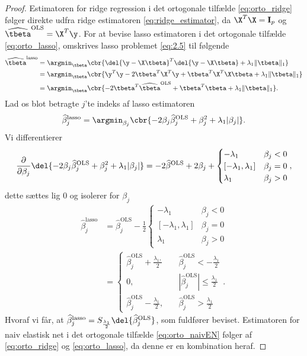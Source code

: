 \begin{proof}
Estimatoren for ridge regression i det ortogonale tilfælde \eqref{eq:orto_ridge} følger direkte udfra ridge estimatoren \eqref{eq:ridge_estimator}, da \(\X^T \X = \mathbf{I}_p\) og \(\widehat{\tbeta}^\text{OLS} = \X^T \y\).
For at bevise lasso estimatoren i det ortogonale tilfælde \eqref{eq:orto_lasso}, omskrives lasso problemet \eqref{eq:2.5} til følgende
\begin{align*}
\widehat{\tbeta}^\text{lasso} &= \argmin_{\tbeta} \cbr{\del{\y - \X \tbeta}^T \del{\y - \X \tbeta} + \lambda_1 \Vert \tbeta \Vert_1} \\
&= \argmin_{\tbeta} \cbr{ \y^T \y - 2 \tbeta^T \X^T \y + \tbeta^T \X^T \X \tbeta + \lambda_1 \Vert \tbeta \Vert_1} \\
&= \argmin_{\tbeta} \cbr{- 2 \tbeta^T \widehat{\tbeta}^\text{OLS} + \tbeta^T \tbeta + \lambda_1 \Vert \tbeta \Vert_1}.
\end{align*}
Lad os blot betragte \(j\)'te indeks af lasso estimatoren
\begin{align*}
\widehat{\beta}_j^\text{lasso} = \argmin_{\beta_j} \cbr{ - 2 \beta_j \widehat{\beta}_j^\text{OLS} + \beta_j^2 + \lambda_1 \vert \beta_j \vert}.
\end{align*}
Vi differentierer
\begin{align*}
\frac{\partial}{\partial \beta_j} \del{- 2 \beta_j \widehat{\beta}_j^\text{OLS} + \beta_j^2 + \lambda_1 \vert \beta_j \vert}
=-2\widehat{\beta}^\text{OLS} + 2\beta_j + \begin{cases}
-\lambda_1 \quad &\beta_j < 0 \\
[-\lambda_1, \lambda_1] & \beta_j = 0 \\
\lambda_1 & \beta_j >0 
\end{cases},
\end{align*}
dette sættes lig \(0\) og isolerer for \(\beta_j\)
\begin{align*}
\widehat{\beta}_j^\text{lasso} &= \widehat{\beta}_j^\text{OLS} - \frac{1}{2}\begin{cases}
-\lambda_1 \quad &\beta_j < 0 \\
[-\lambda_1, \lambda_1] & \beta_j = 0 \\
\lambda_1 & \beta_j >0 
\end{cases} \\
&= \begin{cases}
\widehat{\beta}_j^\text{OLS} + \frac{\lambda_1,}{2} \quad &\widehat{\beta}_j^\text{OLS} < - \frac{\lambda_1}{2} \\
0, &\left\vert\widehat{\beta}_j^\text{OLS} \right\vert \leq \frac{\lambda_1}{2} \\
\widehat{\beta}_j^\text{OLS} - \frac{\lambda_1}{2}, \quad &\widehat{\beta}_j^\text{OLS} > \frac{\lambda_1}{2}
\end{cases}. 
\end{align*}
Hvoraf vi får, at \(\widehat{\beta}_j^\text{lasso} = S_{\frac{\lambda_1}{2}} \del{ \widehat{\beta}_j^\text{OLS}} \), som fuldfører beviset.
Estimatoren for naiv elastisk net i det ortogonale tilfælde \eqref{eq:orto_naivEN} følger af \eqref{eq:orto_ridge} og \eqref{eq:orto_lasso}, da denne er en kombination heraf.
\end{proof}
